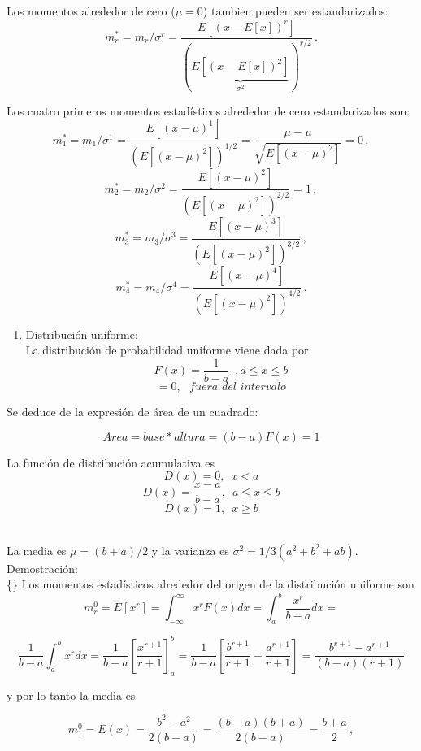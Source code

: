 \documentclass[
]{agujournal2019}
\providecommand{\tightlist}{%
  \setlength{\itemsep}{0pt}\setlength{\parskip}{0pt}}\usepackage{longtable,booktabs,array}
\begin{document}
Los momentos alrededor de cero (\(\mu=0\)) tambien pueden ser
estandarizados:
\[m^*_r=m_r/\sigma^r=\frac{E[(x-E[x])^r]}{(\underbrace{E[(x-E[x])^2]}_{\sigma^2})^{r/2}}\,.\]

Los cuatro primeros momentos estadísticos alrededor de cero
estandarizados son:
\[m^*_1=m_1/\sigma^1=\frac{E[(x-\mu)^1]}{(E[(x-\mu)^2])^{1/2}}=\frac{\mu-\mu}{\sqrt{E[(x-\mu)^2]}}=0\,,\]
\[m^*_2=m_2/\sigma^2=\frac{E[(x-\mu)^2]}{(E[(x-\mu)^2])^{2/2}}=1\,,\]
\[m^*_3=m_3/\sigma^3=\frac{E[(x-\mu)^3]}{(E[(x-\mu)^2])^{3/2}}\,,\]
\[m^*_4=m_4/\sigma^4=\frac{E[(x-\mu)^4]}{(E[(x-\mu)^2])^{4/2}}\,.\]

\vspace{0.5cm}

\begin{enumerate}
\def\labelenumi{\arabic{enumi}.}
\tightlist
\item
  Distribución uniforme:\\
  La distribución de probabilidad uniforme viene dada por
  \[F(x)=\frac{1}{b-a}\,\,\,, a \le x \le b\]
  \[=0,\,\,\,\,fuera\,\,del\,\,intervalo\]
\end{enumerate}

Se deduce de la expresión de área de un cuadrado:

\[Area=base*altura=(b-a)F(x)=1\]

La función de distribución acumulativa es \[D(x)=0,\,\,\,x<a\]
\[D(x)=\frac{x-a}{b-a},\,\,\,a \le x \le b\] \[D(x)=1,\,\,\,x \ge b\]\\

\begin{center}
\end{center}

La media es \(\mu=(b+a)/2\) y la varianza es
\(\sigma^2=1/3(a^2 + b^2 +ab)\). Demostración:\\

\{\noindent\} Los momentos estadísticos alrededor del origen de la
distribución uniforme son
\[m^0_r=E[x^r]=\int^{\infty}_{-\infty} x^rF(x)dx=\int^{b}_{a} \frac{x^r}{b-a}dx=\]

\[\frac{1}{b-a}\int^{b}_{a}x^r dx=\frac{1}{b-a}\left[\frac{x^{r+1}}{r+1}\right]^b_a=
      \frac{1}{b-a}\left[\frac{b^{r+1}}{r+1}-\frac{a^{r+1}}{r+1}\right]=\frac{b^{r+1}-a^{r+1}}{(b-a)(r+1)}\]

y por lo tanto la media es

\[m^0_1=E(x)=\frac{b^2-a^2}{2(b-a)}=\frac{(b-a)(b+a)}{2(b-a)}=\frac{b+a}{2}\,,\]
\end{document}
